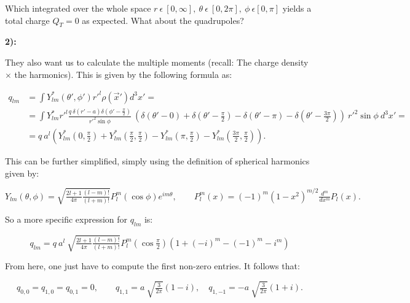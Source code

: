 Which integrated over the whole space $r \:\epsilon\: [0, \infty],\: \theta\: \epsilon \:[0, 2\pi], \:\phi \:\epsilon [0, \pi]$ yields a total charge $Q_{T}=0$ as expected. What about the quadrupoles?

\textbf{2):}

They also want us to calculate the multiple moments (recall: The charge density $\times$ the harmonics). This is given by the following formula as:

\begin{equation}
	\begin{split}
	q_{lm} &= \int Y^{*}_{lm} (\theta', \phi')r'^{l} \rho (\vec{x}') d^{3}x'=\\
	&= \int Y^{*}_{lm}r'^{l} \tfrac{q \:\delta (r' -a) \delta (\phi' - \tfrac{\pi}{2})}{r'^{2} \sin \phi}\: \left( \delta(\theta' - 0) + \delta(\theta' - \tfrac{\pi}{2}) -\delta(\theta' - \pi) - \delta(\theta' - \tfrac{3\pi}{2})\right)\: r'^{2} \sin \phi \: d^{3}x'=\\
	& = q \: a^{l} \left( Y^{*}_{lm} (0, \tfrac{\pi}{2}) + Y^{*}_{lm} (\tfrac{\pi}{2}, \tfrac{\pi}{2}) - Y^{*}_{lm} (\pi, \tfrac{\pi}{2}) - Y^{*}_{lm} (\tfrac{3\pi}{2}, \tfrac{\pi}{2})\right).
	\end{split}
\end{equation}

This can be further simplified, simply using the definition of spherical harmonics given by:

\begin{equation}
	Y_{lm} (\theta, \phi) = \sqrt{\tfrac{2l+1}{4\pi}\tfrac{(l-m)!}{(l+m)!}} P^{m}_{l} (\cos \phi) e^{im\theta}, \quad \quad P^{m}_{l} (x) = (-1)^{m} (1- x^{2})^{m/2} \tfrac{d^{m}}{dx^{m}} P_{l} (x).
\end{equation}

So a more specific expression for $q_{lm}$ is:

\begin{equation}
	q_{lm} = q \: a^{l} \: \sqrt{\tfrac{2l+1}{4\pi}\tfrac{(l-m)!}{(l+m)!}} P^{m}_{l} (\cos \tfrac{\pi}{2}) \left(1 + (-i)^{m} - (-1)^{m}- i^{m}\right)
\end{equation}

From here, one just have to compute the first non-zero entries. It follows that:

\begin{equation}
	q_{0,0} = q_{1,0} = q_{0,1} = 0, \quad \quad q_{1,1} = a \: \sqrt{\tfrac{3}{2\pi}}(1-i), \quad q_{1,-1} = -a \: \sqrt{\tfrac{3}{2\pi}}(1+i).
\end{equation}

